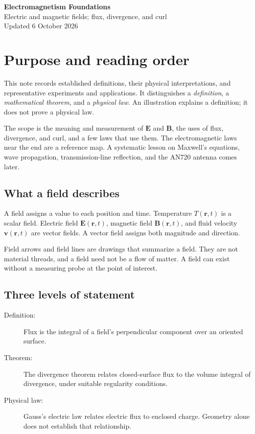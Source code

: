 \documentclass[11pt,letterpaper]{article}
\newcommand{\vect}[1]{\boldsymbol{#1}}
\begin{document}
\begin{center}
{\LARGE\bfseries\color{ink} Electromagnetism Foundations}\\[6pt]
{\large Electric and magnetic fields; flux, divergence, and curl}\\[6pt]
{\small Updated 6 October 2026}
\end{center}

\section*{Purpose and reading order}
This note records established definitions, their physical interpretations, and representative experiments and applications. It distinguishes a \emph{definition}, a \emph{mathematical theorem}, and a \emph{physical law}. An illustration explains a definition; it does not prove a physical law.

The scope is the meaning and measurement of $\vect E$ and $\vect B$, the uses of flux, divergence, and curl, and a few laws that use them. The electromagnetic laws near the end are a reference map. A systematic lesson on Maxwell's equations, wave propagation, transmission-line reflection, and the AN720 antenna comes later.

\subsection*{What a field describes}
A field assigns a value to each position and time. Temperature $T(\vect r,t)$ is a scalar field. Electric field $\vect E(\vect r,t)$, magnetic field $\vect B(\vect r,t)$, and fluid velocity $\vect v(\vect r,t)$ are vector fields. A vector field assigns both magnitude and direction.

Field arrows and field lines are drawings that summarize a field. They are not material threads, and a field need not be a flow of matter. A field can exist without a measuring probe at the point of interest.

\subsection*{Three levels of statement}
\begin{description}
\item[Definition:] Flux is the integral of a field's perpendicular component over an oriented surface.
\item[Theorem:] The divergence theorem relates closed-surface flux to the volume integral of divergence, under suitable regularity conditions.
\item[Physical law:] Gauss's electric law relates electric flux to enclosed charge. Geometry alone does not establish that relationship.
\end{description}
\end{document}
